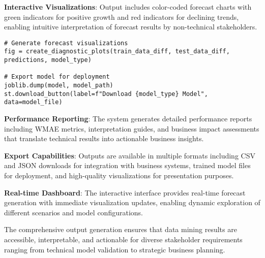 \textbf{Interactive Visualizations}: Output includes color-coded forecast charts with green indicators for positive growth and red indicators for declining trends, enabling intuitive interpretation of forecast results by non-technical stakeholders.

\begin{lstlisting}[style=bashstyle, caption={Output Generation and Export}]
# Generate forecast visualizations
fig = create_diagnostic_plots(train_data_diff, test_data_diff, predictions, model_type)

# Export model for deployment
joblib.dump(model, model_path)
st.download_button(label=f"Download {model_type} Model", data=model_file)
\end{lstlisting}

\textbf{Performance Reporting}: The system generates detailed performance reports including WMAE metrics, interpretation guides, and business impact assessments that translate technical results into actionable business insights.

\textbf{Export Capabilities}: Outputs are available in multiple formats including CSV and JSON downloads for integration with business systems, trained model files for deployment, and high-quality visualizations for presentation purposes.

\textbf{Real-time Dashboard}: The interactive interface provides real-time forecast generation with immediate visualization updates, enabling dynamic exploration of different scenarios and model configurations.

The comprehensive output generation ensures that data mining results are accessible, interpretable, and actionable for diverse stakeholder requirements ranging from technical model validation to strategic business planning.
